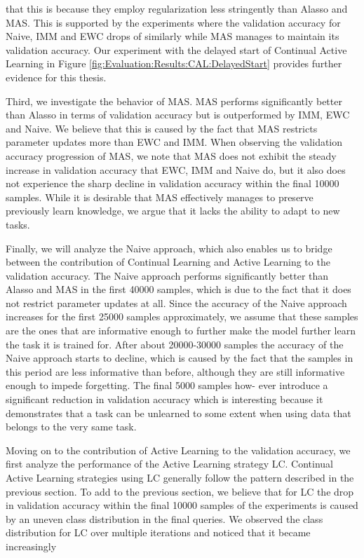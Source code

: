 that this is because they employ regularization less stringently than Alasso and MAS. This is supported by the experiments where the validation accuracy for Naive, IMM and EWC drops of similarly while MAS manages to maintain its validation accuracy. Our experiment with the delayed
start of Continual Active Learning in Figure \ref{fig:Evaluation:Results:CAL:DelayedStart} provides further evidence for this thesis. \par
Third, we investigate the behavior of MAS. MAS performs significantly better than Alasso in terms of validation accuracy but is outperformed by IMM, EWC and Naive. We believe that this is caused by the fact that MAS restricts parameter updates more than EWC and IMM. When observing
the validation accuracy progression of MAS, we note that MAS does not exhibit the steady increase in validation accuracy that EWC, IMM and Naive do, but it also does not experience the sharp decline in validation accuracy within the final 10000 samples. While it is desirable that
MAS effectively manages to preserve previously learn knowledge, we argue that it lacks the ability to adapt to new tasks. \par
Finally, we will analyze the Naive approach, which also enables us to bridge between the contribution of Continual Learning and Active Learning to the validation accuracy. The Naive approach performs significantly better than Alasso and MAS in the first 40000 samples, which is due
to the fact that it does not restrict parameter updates at all. Since the accuracy of the Naive approach increases for the first 25000 samples approximately, we assume that these samples are the ones that are informative enough to further make the model further learn the task it is
trained for. After about 20000-30000 samples the accuracy of the Naive approach starts to decline, which is caused by the fact that the samples in this period are less informative than before, although they are still informative enough to impede forgetting. The final 5000 samples how-
ever introduce a significant reduction in validation accuracy which is interesting because it demonstrates that a task can be unlearned to some extent when using data that belongs to the very same task. \par
Moving on to the contribution of Active Learning to the validation accuracy, we first analyze the performance of the Active Learning strategy LC. Continual Active Learning strategies using LC generally follow the pattern described in the previous section. To add to the previous
section, we believe that for LC the drop in validation accuracy within the final 10000 samples of the experiments is caused by an uneven class distribution in the final queries. We observed the class distribution for LC over multiple iterations and noticed that it became increasingly
